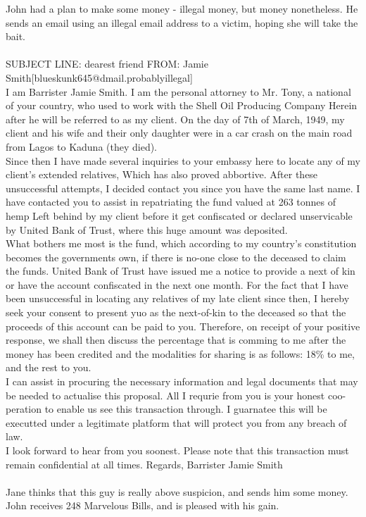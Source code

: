 \documentclass{article}
\begin{document}
John had a plan to make some money {-} illegal money, but money nonetheless.
He sends an email using an illegal email address to a victim, hoping she will take the bait.
\\\\
SUBJECT LINE: dearest friend
FROM: Jamie Smith[blueskunk645@dmail.probablyillegal]
\\
I am Barrister Jamie Smith.
I am the personal attorney to Mr. Tony, a national of your country, who used to work with the Shell Oil Producing Company
Herein after he will be referred to as my client.
On the day of 7th of March, 1949, my client and his wife and their only daughter were in a car crash on the main road from Lagos to Kaduna (they died).
\\
Since then I have made several inquiries to your embassy here to locate any of my client's extended relatives, Which has also proved abbortive.
After these unsuccessful attempts, I decided contact you since you have the same last name.
I have contacted you to assist in repatriating the fund valued at 263 tonnes of hemp Left behind by my client before it get confiscated or declared unservicable by United Bank of Trust, where this huge amount was deposited.
\\
What bothers me most is the fund, which according to my country's constitution becomes the governments own, if there is no{-}one close to the deceased to claim the funds.
United Bank of Trust have issued me a notice to provide a next of kin or have the account confiscated in the next one month.
For the fact that I have been unsuccessful in locating any relatives of my late client since then, I hereby seek your consent to present yuo as the next{-}of{-}kin to the deceased so that the proceeds of this account can be paid to you.
Therefore, on receipt of your positive response, we shall then discuss the percentage that is comming to me after the money has been credited and the modalities for sharing is as follows: 18\% to me, and the rest to you.
\\
I can assist in procuring the necessary information and legal documents that may be needed to actualise this proposal.
All I requrie from you is your honest coo{-}peration to enable us see this transaction through.
I guarnatee this will be executted under a legitimate platform that will protect you from any breach of law.
\\
I look forward to hear from you soonest.
Please note that this transaction must remain confidential at all times.
Regards, Barrister Jamie Smith
\\\\
Jane thinks that this guy is really above suspicion, and sends him some money.
John receives 248 Marvelous Bills, and is pleased with his gain.
\end{document}
